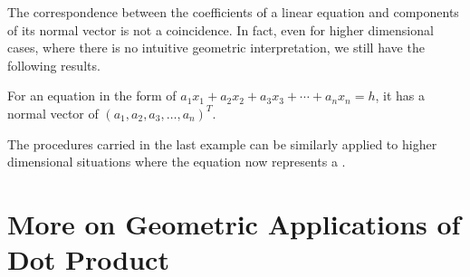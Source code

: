 The correspondence between the coefficients of a linear equation and components of its normal vector is not a coincidence. In fact, even for higher dimensional cases, where there is no intuitive geometric interpretation, we still have the following results.
\begin{proper}
\label{proper:normalhyperplane}
For an equation in the form of $a_1x_1 + a_2x_2 + a_3x_3 + \cdots + a_nx_n = h$, it has a normal vector of $(a_1, a_2, a_3, \ldots, a_n)^T$.
\end{proper}
The procedures carried in the last example can be similarly applied to higher dimensional situations where the equation now represents a .

\section{More on Geometric Applications of Dot Product}
